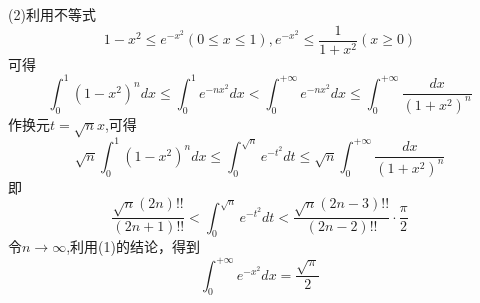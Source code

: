 \documentclass{ctexart}
\begin{document}
(2)利用不等式$$ 1-x^{2}\leq e^{-x^{2}} (0\leq x\leq 1),e^{-x^{2}}\leq \frac{1}{1+x^{2}}(x\geq 0)$$
可得$$\int_{0}^{1}(1-x^{2})^{n}dx \leq \int_{0}^{1}e^{-nx^{2}}dx<\int_{0}^{+\infty}e^{-nx^{2}}dx
\leq \int_{0}^{+\infty}\frac{dx}{(1+x^{2})^{n}}$$
作换元$t=\sqrt{n}x$,可得$$\sqrt{n}\int_{0}^{1}(1-x^{2})^{n}dx \leq \int_{0}^{\sqrt{n}}e^{-t^{2}}dt\leq \sqrt{n}\int_{0}^{+\infty}\frac{dx}{(1+x^{2})^{n}}$$
即$$\frac{\sqrt{n}(2n)!!}{(2n+1)!!}<\int_{0}^{\sqrt{n}}e^{-t^{2}}dt<\frac{\sqrt{n}(2n-3)!!}{(2n-2)!!}\cdot\frac{\pi}{2}$$
令$n\rightarrow\infty$,利用(1)的结论，得到$$\int_{0}^{+\infty}e^{-x^{2}} dx=\frac{\sqrt{\pi}}{2}$$
\end{document}
